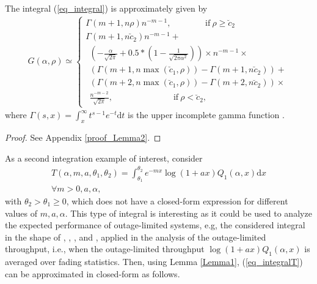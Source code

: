\begin{lem}\label{Lemma2}
The integral (\ref{eq_integral}) is approximately given by
\begin{align}
G(\alpha,\rho)\simeq
\begin{cases}
\Gamma(m+1,n\rho)n^{-m-1}, ~~~~~~~~~~~~~~~~~~\mathrm{if}~  \rho \geq \breve{c}_2  \\ 
\Gamma(m+1,n\breve{c}_2)n^{-m-1} + \\
~~\left(-\frac{\alpha}{\sqrt{2\pi}}+0.5*\left(1-\frac{1}{\sqrt{2\pi\alpha^2}}\right)\right)\times n^{-m-1}\times\\
~~\left(\Gamma(m+1,n\max(\breve{c}_1,\rho))-\Gamma(m+1,n\breve{c}_2)\right)+\\
~~\left(\Gamma(m+2,n\max(\breve{c}_1,\rho))-\Gamma(m+2,n\breve{c}_2)\right)\times\\
~~\frac{n^{-m-2}}{\sqrt{2\pi}},
~~~~~~~~~~~~~~~~~~~~~~~~~~~~~~~~\mathrm{if}~  \rho<\breve{c}_2,
\end{cases}
\end{align}
where $\Gamma(s,x) = \int_{x}^{\infty} t^{s-1}e^{-t} \mathrm{d}t$ is the upper incomplete gamma function \cite[Eq. 6.5.1]{abramowitz1999ia}.
\end{lem}
\begin{proof}
See Appendix \ref{proof_Lemma2}. 
\end{proof}









As a second integration example of interest, consider
\begin{align}\label{eq_integralT}
    T(\alpha,m,a,\theta_1,\theta_2) = \int_{\theta_1}^{\theta_2} e^{-mx}\log(1+ax)Q_1(\alpha,x)\text{d}x \nonumber\\\forall m>0,a,\alpha,
\end{align}
with $\theta_2>\theta_1\geq0$, which does not have a closed-form expression for different values of $m, a, \alpha$. This type of integral is interesting as it could be used to analyze the expected performance of outage-limited systems, e.g,  the considered integral in the shape of \cite[eq. (1) (13)]{Simon2003TWCsome}, \cite[eq. (2)]{Cao2016CLsolutions}, \cite[eq. (3)]{Cui2012ELtwo}, and \cite[eq. (1)]{Gaur2003TVTsome}, applied in the analysis of the outage-limited throughput, i.e., when the outage-limited throughput $\log(1+ax)Q_1(\alpha,x)$  \cite[p. 2631]{Biglieri1998TITfading}\cite[Theorem 6]{Verdu1994TITgeneral}\cite[Eq. (9)]{Makki2014TCperformance} is averaged over fading statistics. Then, using Lemma \ref{Lemma1}, (\ref{eq_integralT}) can be approximated in closed-form as follows.

